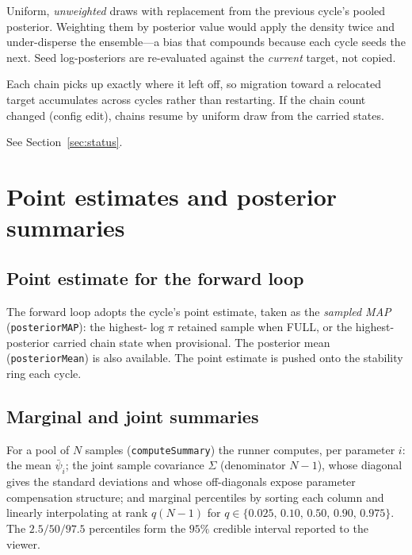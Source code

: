 \documentclass[11pt]{article}
\newcommand{\code}[1]{\texttt{\small #1}}
\begin{document}
\begin{description}[leftmargin=1.4em,nosep]
  \item[WarmStart.] Uniform, \emph{unweighted} draws with replacement
  from the previous cycle's pooled posterior. Weighting them by posterior
  value would apply the density twice and under-disperse the ensemble---a
  bias that compounds because each cycle seeds the next. Seed
  log-posteriors are re-evaluated against the \emph{current} target, not
  copied.
  \item[ProvisionalResume.] Each chain picks up exactly where it left off,
  so migration toward a relocated target accumulates across cycles rather
  than restarting. If the chain count changed (config edit), chains resume
  by uniform draw from the carried states.
  \item[ColdStart / RatioReseed.] See Section~\ref{sec:status}.
\end{description}

\section{Point estimates and posterior summaries}

\subsection{Point estimate for the forward loop}
The forward loop adopts the cycle's point estimate, taken as the
\emph{sampled MAP} (\code{posteriorMAP}): the highest-$\log\pi$ retained
sample when FULL, or the highest-posterior carried chain state when
provisional. The posterior mean (\code{posteriorMean}) is also available.
The point estimate is pushed onto the stability ring each cycle.

\subsection{Marginal and joint summaries}
For a pool of $N$ samples (\code{computeSummary}) the runner computes, per
parameter $i$: the mean $\bar\psi_i$; the joint sample covariance
$\Sigma$ (denominator $N-1$), whose diagonal gives the standard
deviations and whose off-diagonals expose parameter compensation
structure; and marginal percentiles by sorting each column and linearly
interpolating at rank $q(N-1)$ for
$q\in\{0.025,\,0.10,\,0.50,\,0.90,\,0.975\}$. The
$2.5/50/97.5$ percentiles form the $95\%$ credible interval reported to
the viewer.
\end{document}
